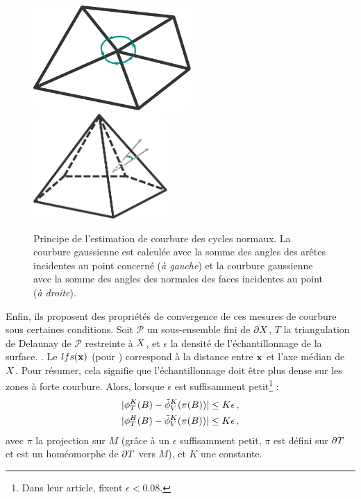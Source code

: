 \begin{figure}[ht]{
    \begin{center}
    \includegraphics[height=4cm]{figures/NormalCycle1}
    \includegraphics[height=4cm]{figures/NormalCycle2}
    \end{center}}
    \caption{Principe de l'estimation de courbure des cycles normaux. La courbure gaussienne est calculée avec la somme des angles des arêtes incidentes au point concerné (\emph{à gauche}) et la courbure gaussienne avec la somme des angles des normales des faces incidentes au point (\emph{à droite}).
      \label{fig:normal-cycle}}
\end{figure}

Enfin, ils proposent des propriétés de convergence de ces mesures de courbure
sous certaines conditions. Soit $\mathcal{P}$ un sous-ensemble fini de $\partial X$,
$T$ la triangulation de Delaunay de $\mathcal{P}$ restreinte à $X$, et
$\epsilon$ la densité de l'échantillonnage de la surface.
%
.
%
Le $lfs(\mathbf{x})$ (pour ) correspond à la
distance entre $\mathbf{x}$ et l'axe médian de $X$. Pour résumer, cela signifie
que l'échantillonnage doit être plus dense sur les zones à forte courbure.
Alors, lorsque $\epsilon$ est suffisamment petit\footnote{Dans leur article,  fixent $\epsilon < 0.08$.} :
%
\begin{align}
  &|\phi^{K}_T(B) - \tilde{\phi}^{K}_V(\pi(B)) | \le K\epsilon \,,\\
  &|\phi^{H}_T(B)  - \tilde{\phi}^{K}_V(\pi(B)) | \le K\epsilon \,,
\end{align}
%
avec $\pi$ la projection sur $M$ (grâce à un $\epsilon$ suffisamment petit, $\pi$ est défini
sur $\partial T$ et est un homéomorphe de $\partial T$ vers $M$), et $K$ une constante.


